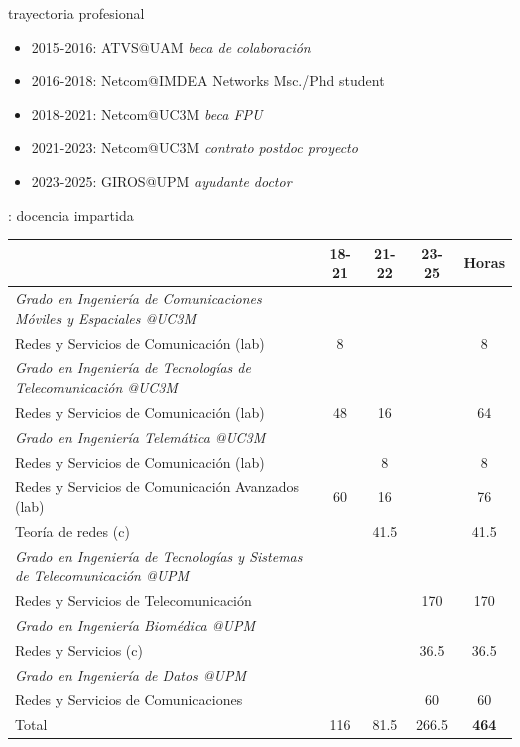\documentclass[xcolor=table,xcolor=x11names]{beamer}
\begin{document}
\begin{frame}{\secname}{trayectoria profesional}
    \begin{itemize}
        \item 2015-2016: ATVS@UAM \emph{beca de colaboración}
        \item 2016-2018: Netcom@IMDEA Networks Msc./Phd student
        \item 2018-2021: Netcom@UC3M \emph{beca FPU}
        \item 2021-2023: Netcom@UC3M \emph{contrato postdoc proyecto}
        \item 2023-2025: GIROS@UPM \emph{ayudante doctor}
    \end{itemize}
\end{frame}



\begin{frame}{\secname: docencia impartida}
    \begin{table}
        \centering
        \tiny
        \begin{tabular}{ p{6cm} | c c c c}
            \toprule
             & \textbf{18-21} & \textbf{21-22} & \textbf{23-25} & \textbf{Horas}\\ \midrule
            \rowcolor{upmblue!20}\emph{Grado en Ingeniería de Comunicaciones Móviles y Espaciales @UC3M} & & & &\\ 
            Redes y Servicios de Comunicación (lab) & 8 &   &  & 8\\ \midrule
            \rowcolor{upmblue!20}\emph{Grado en Ingeniería de Tecnologías de Telecomunicación @UC3M} & & & &\\ 
            Redes y Servicios de Comunicación (lab) & 48 & 16  &  & 64\\ \midrule
            \rowcolor{upmblue!20}\emph{Grado en Ingeniería Telemática @UC3M} & & & &\\ 
            Redes y Servicios de Comunicación (lab) &   & 8 &  & 8 \\ 
            Redes y Servicios de Comunicación Avanzados (lab) & 60 & 16  &  & 76\\ 
            Teoría de redes (c) &  & 41.5  &  & 41.5\\ \midrule
            \rowcolor{upmblue!20}\emph{Grado en Ingeniería de Tecnologías y Sistemas de Telecomunicación @UPM} & & & &\\ 
            Redes y Servicios de Telecomunicación &  &    & 170  & 170\\ \midrule
            \rowcolor{upmblue!20}\emph{Grado en Ingeniería Biomédica @UPM} & & &  &  \\ 
            Redes y Servicios (c) &  &   & 36.5 & 36.5\\ \midrule
            \rowcolor{upmblue!20}\emph{Grado en Ingeniería de Datos @UPM} & & & &\\ 
            Redes y Servicios de Comunicaciones &  &  & 60 & 60\\ \midrule
           \rowcolor{gray!30} Total & 116 & 81.5 & 266.5 & \textbf{464}\\ \bottomrule
        \end{tabular}
    \end{table}
\end{frame}
\end{document}

